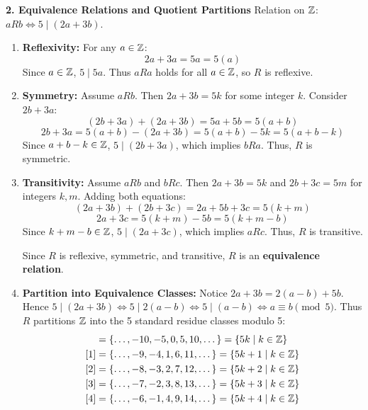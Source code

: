 \textbf{2. Equivalence Relations and Quotient Partitions}
Relation on $\mathbb{Z}$: $a R b \iff 5 \mid (2a + 3b)$.
\begin{enumerate}
    \item \textbf{Reflexivity:} For any $a \in \mathbb{Z}$:
    $$2a + 3a = 5a = 5(a)$$
    Since $a \in \mathbb{Z}$, $5 \mid 5a$. Thus $a R a$ holds for all $a \in \mathbb{Z}$, so $R$ is reflexive.
    \item \textbf{Symmetry:} Assume $a R b$. Then $2a + 3b = 5k$ for some integer $k$. Consider $2b + 3a$:
    $$(2b + 3a) + (2a + 3b) = 5a + 5b = 5(a + b)$$
    $$2b + 3a = 5(a + b) - (2a + 3b) = 5(a + b) - 5k = 5(a + b - k)$$
    Since $a + b - k \in \mathbb{Z}$, $5 \mid (2b + 3a)$, which implies $b R a$. Thus, $R$ is symmetric.
    \item \textbf{Transitivity:} Assume $a R b$ and $b R c$. Then $2a + 3b = 5k$ and $2b + 3c = 5m$ for integers $k, m$.
    Adding both equations:
    $$(2a + 3b) + (2b + 3c) = 2a + 5b + 3c = 5(k + m)$$
    $$2a + 3c = 5(k + m) - 5b = 5(k + m - b)$$
    Since $k + m - b \in \mathbb{Z}$, $5 \mid (2a + 3c)$, which implies $a R c$. Thus, $R$ is transitive.
    
    Since $R$ is reflexive, symmetric, and transitive, $R$ is an \textbf{equivalence relation}.
    \item \textbf{Partition into Equivalence Classes:}
    Notice $2a + 3b = 2(a - b) + 5b$. Hence $5 \mid (2a + 3b) \iff 5 \mid 2(a - b) \iff 5 \mid (a - b) \iff a \equiv b \pmod 5$.
    Thus $R$ partitions $\mathbb{Z}$ into the 5 standard residue classes modulo 5:
    \begin{align*}
        [0] &= \{\dots, -10, -5, 0, 5, 10, \dots\} = \{5k \mid k \in \Z\} \\
        [1] &= \{\dots, -9, -4, 1, 6, 11, \dots\} = \{5k + 1 \mid k \in \Z\} \\
        [2] &= \{\dots, -8, -3, 2, 7, 12, \dots\} = \{5k + 2 \mid k \in \Z\} \\
        [3] &= \{\dots, -7, -2, 3, 8, 13, \dots\} = \{5k + 3 \mid k \in \Z\} \\
        [4] &= \{\dots, -6, -1, 4, 9, 14, \dots\} = \{5k + 4 \mid k \in \Z\}
    \end{align*}
\end{enumerate}

